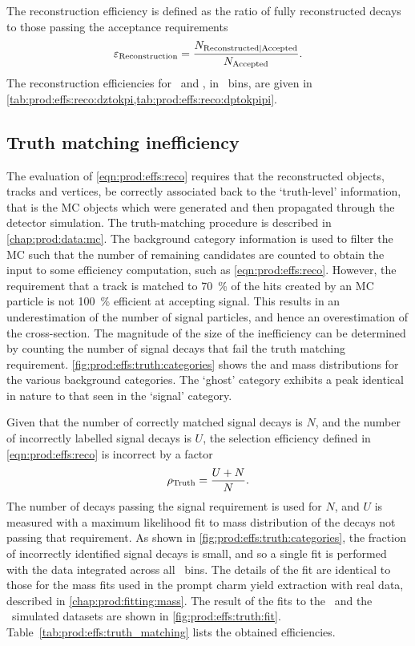 The reconstruction efficiency is defined as the ratio of fully reconstructed 
decays to those passing the acceptance requirements
\begin{equation}
  \effreco = \frac{%
    N_{\text{Reconstructed}|\text{Accepted}}
  }
  {%
    N_{\text{\text{Accepted}}}
  }.
  \label{eqn:prod:effs:reco}
\end{equation}
The reconstruction efficiencies for \DzToKpi\ and \DpToKpipi, in \pTy\ bins, are 
given in \cref{tab:prod:effs:reco:dztokpi,tab:prod:effs:reco:dptokpipi}.

\subsection{Truth matching inefficiency}
\label{chap:prod:effs:truth}

The evaluation of \cref{eqn:prod:effs:reco} requires that the reconstructed 
objects, tracks and vertices, be correctly associated back to the `truth-level' 
information, that is the \ac{MC} objects which were generated and then 
propagated through the detector simulation.
The truth-matching procedure is described in \cref{chap:prod:data:mc}.
The background category information is used to filter the \ac{MC} such that the 
number of remaining candidates are counted to obtain the input to some 
efficiency computation, such as \cref{eqn:prod:effs:reco}.
However, the requirement that a track is matched to \SI{70}{\percent} of the 
hits created by an \ac{MC} particle is not \SI{100}{\percent} efficient at 
accepting signal.
This results in an underestimation of the number of signal particles, and hence 
an overestimation of the cross-section.
The magnitude of the size of the inefficiency can be determined by counting the 
number of signal decays that fail the truth matching requirement.
\cref{fig:prod:effs:truth:categories} shows the \PDzero and \PDplus mass 
distributions for the various background categories.
The `ghost' category exhibits a peak identical in nature to that seen in the 
`signal' category.

Given that the number of correctly matched signal decays is $N$, and the number 
of incorrectly labelled signal decays is $U$, the selection efficiency defined 
in \cref{eqn:prod:effs:reco} is incorrect by a factor
\begin{equation}
  \rho_{\textnormal{Truth}} = \frac{U+N}{N}.
  \label{eqn:prod:effs:truth}
\end{equation}
The number of decays passing the signal requirement is used for $N$, and $U$ is 
measured with a maximum likelihood fit to mass distribution of the decays not 
passing that requirement.
As shown in \cref{fig:prod:effs:truth:categories}, the fraction of incorrectly 
identified signal decays is small, and so a single fit is performed with the 
data integrated across all \pTy\ bins.
The details of the fit are identical to those for the mass fits used in the 
prompt charm yield extraction with real data, described in 
\cref{chap:prod:fitting:mass}.
The result of the fits to the \DzToKpi\ and the \DpToKpipi\ simulated datasets 
are shown in \cref{fig:prod:effs:truth:fit}.
Table~\ref{tab:prod:effs:truth_matching} lists the obtained efficiencies.

